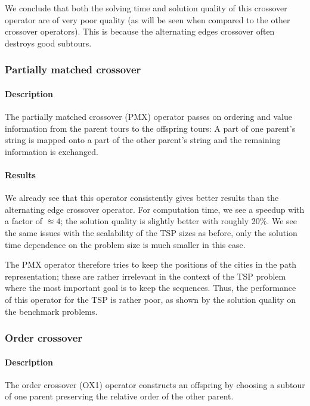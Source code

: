 ﻿\documentclass[a4paper,english,11pt,]{scrartcl}
\begin{document}
We conclude that both the solving time and solution quality of this crossover operator are of very poor quality (as will be seen when compared to the other crossover operators). This is because the alternating edges crossover often destroys good subtours. 




\subsubsection{Partially matched crossover}
\paragraph{Description}
The partially matched crossover (PMX) operator passes on ordering and value information
from the parent tours to the offspring tours: A part of one parent's string
is mapped onto a part of the other parent's string and the remaining
information is exchanged.

\paragraph{Results}
We already see that this operator consistently gives better results than the alternating edge crossover operator. For computation time, we see a speedup with a factor of $\approxeq 4$; the solution quality is slightly better with roughly 20\%. We see the same issues with the scalability of the TSP sizes as before, only the solution time dependence on the problem size is much smaller in this case. 

The PMX operator therefore tries to keep the positions of the cities in
the path representation; these are rather irrelevant in the context of the
TSP problem where the most important goal is to keep the sequences.
Thus, the performance of this operator for the TSP is rather poor, as shown by the solution quality on the benchmark problems.


% 
% 
\subsubsection{Order crossover}
\paragraph{Description}
The order crossover (OX1) operator constructs an offspring by choosing a subtour of one parent preserving
the relative order of the other parent. 
\end{document}
